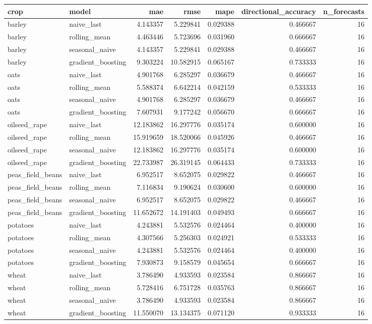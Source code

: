 \begin{tabular}{llrrrrr}
\toprule
crop & model & mae & rmse & mape & directional\_accuracy & n\_forecasts \\
\midrule
barley & naive\_last & 4.143357 & 5.229841 & 0.029388 & 0.466667 & 16 \\
barley & rolling\_mean & 4.463446 & 5.723696 & 0.031960 & 0.666667 & 16 \\
barley & seasonal\_naive & 4.143357 & 5.229841 & 0.029388 & 0.466667 & 16 \\
barley & gradient\_boosting & 9.303224 & 10.582915 & 0.065167 & 0.733333 & 16 \\
oats & naive\_last & 4.901768 & 6.285297 & 0.036679 & 0.466667 & 16 \\
oats & rolling\_mean & 5.588374 & 6.642214 & 0.042159 & 0.533333 & 16 \\
oats & seasonal\_naive & 4.901768 & 6.285297 & 0.036679 & 0.466667 & 16 \\
oats & gradient\_boosting & 7.607931 & 9.177242 & 0.056670 & 0.666667 & 16 \\
oilseed\_rape & naive\_last & 12.183862 & 16.297776 & 0.035174 & 0.600000 & 16 \\
oilseed\_rape & rolling\_mean & 15.919659 & 18.520066 & 0.045926 & 0.466667 & 16 \\
oilseed\_rape & seasonal\_naive & 12.183862 & 16.297776 & 0.035174 & 0.600000 & 16 \\
oilseed\_rape & gradient\_boosting & 22.733987 & 26.319145 & 0.064433 & 0.733333 & 16 \\
peas\_field\_beans & naive\_last & 6.952517 & 8.652075 & 0.029822 & 0.466667 & 16 \\
peas\_field\_beans & rolling\_mean & 7.116834 & 9.190624 & 0.030600 & 0.600000 & 16 \\
peas\_field\_beans & seasonal\_naive & 6.952517 & 8.652075 & 0.029822 & 0.466667 & 16 \\
peas\_field\_beans & gradient\_boosting & 11.652672 & 14.191403 & 0.049493 & 0.666667 & 16 \\
potatoes & naive\_last & 4.243881 & 5.532576 & 0.024464 & 0.400000 & 16 \\
potatoes & rolling\_mean & 4.307566 & 5.256303 & 0.024921 & 0.533333 & 16 \\
potatoes & seasonal\_naive & 4.243881 & 5.532576 & 0.024464 & 0.400000 & 16 \\
potatoes & gradient\_boosting & 7.930873 & 9.158579 & 0.045654 & 0.666667 & 16 \\
wheat & naive\_last & 3.786490 & 4.933593 & 0.023584 & 0.866667 & 16 \\
wheat & rolling\_mean & 5.728416 & 6.751728 & 0.035763 & 0.866667 & 16 \\
wheat & seasonal\_naive & 3.786490 & 4.933593 & 0.023584 & 0.866667 & 16 \\
wheat & gradient\_boosting & 11.550070 & 13.134375 & 0.071120 & 0.933333 & 16 \\
\bottomrule
\end{tabular}
